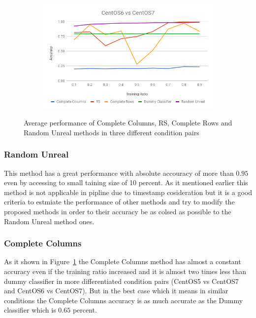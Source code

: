 \documentclass[10pt, conference, compsocconf]{IEEEtran}
\begin{document}
\begin{figure}[h!]
\begin{subfigure}[b]{0.8\linewidth}
        \end{subfigure}
        \begin{subfigure}[b]{0.8\linewidth}
                \includegraphics[width=\columnwidth]{figures/ALS/AlS-Failure-6vs7}
        \end{subfigure}
        \caption{Average performance of Complete Columns, RS, Complete Rows and Random Unreal methods in three different condition pairs}
        \label{fig:ALS-Failure}
\end{figure}

\subsubsection{Random Unreal}
This method has a great performance with absolute accouracy of more than $0.95$ 
even by accessing to small taining size of 10 percent. As it mentioned earlier 
this method is not applicable in pipline due to timestamp cosideration but it 
is a good criteria to estmiate the performance of other methods and try to modify 
the proposed methods in order to their accuracy be as colsed as possible to the 
Random Unreal method ones.  


\subsubsection{Complete Columns}
As it shown in Figure~\ref{fig:ALS-Failure} the Complete Columns method has
almost a constant accuracy even if the training ratio increased and it
is almost two times less than dummy classifier in more differentiated
condition pairs (CentOS5 vs CentOS7 and CentOS6 vs CentOS7). But in the
best case which it means in similar conditions the Complete Columns
accuracy is as much accurate as the Dummy classifier which is $0.65$
percent.
\\
\end{document}
